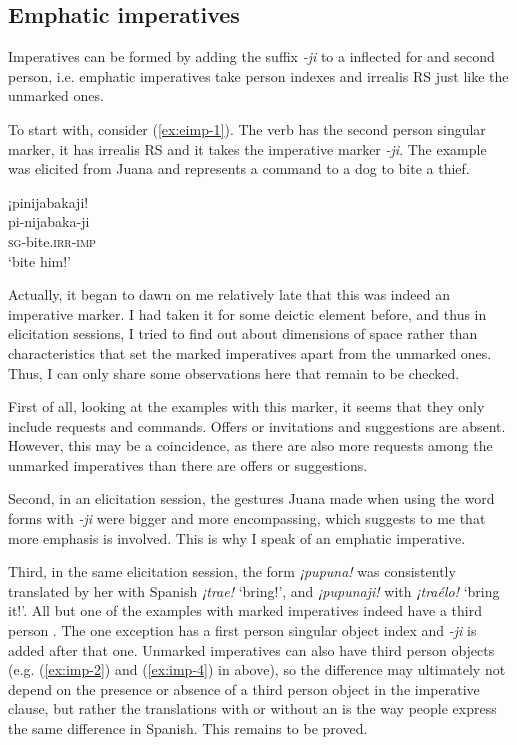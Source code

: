 

\subsection{Emphatic imperatives}\label{sec:MarkedImperatives}

Imperatives can be formed by adding the suffix \textit{-ji} to a  inflected for  and second person, i.e. emphatic imperatives take person indexes and irrealis RS just like the unmarked ones.

To start with, consider (\ref{ex:eimp-1}). The verb has the second person singular marker, it has irrealis RS and it takes the imperative marker \textit{-ji}. The example was elicited from Juana and represents a command to a dog to bite a thief.

\ea\label{ex:eimp-1}
\begingl
\glpreamble ¡pinijabakaji!\\
\gla pi-nijabaka-ji\\
\textsc{sg}-bite.\textsc{irr}-\textsc{imp}\\
\glft ‘bite him!’
\endgl
\trailingcitation{[jxx-e191021e-2]}
\xe

Actually, it began to dawn on me relatively late that this was indeed an imperative marker. I had taken it for some deictic element before, and thus in elicitation sessions, I tried to find out about dimensions of space rather than characteristics that set the marked imperatives apart from the unmarked ones. Thus, I can only share some observations here that remain to be checked.

First of all, looking at the examples with this marker, it seems that they only include requests and commands. Offers or invitations and suggestions are absent. However, this may be a coincidence, as there are also more requests among the unmarked imperatives than there are offers or suggestions.

Second, in an elicitation session, the gestures Juana made when using the word forms with \textit{-ji} were bigger and more encompassing, which suggests to me that more emphasis is involved. This is why I speak of an emphatic imperative.

Third, in the same elicitation session, the form \textit{¡pupuna!} was consistently translated by her with Spanish \textit{¡trae!} ‘bring!’, and \textit{¡pupunaji!} with \textit{¡traélo!} ‘bring it!’. All but one of the examples with marked imperatives indeed have a third person . The one exception has a first person singular object index and \textit{-ji} is added after that one. Unmarked imperatives can also have third person objects (e.g. (\ref{ex:imp-2}) and (\ref{ex:imp-4}) in  above), so the difference may ultimately not depend on the presence or absence of a third person object in the imperative clause, but rather the translations with or without an  is the way people express the same difference in Spanish. This remains to be proved.

